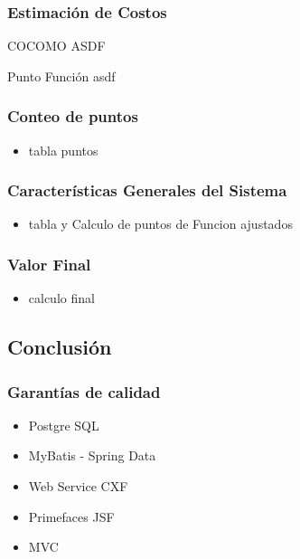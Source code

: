 \documentclass{beamer}
\begin{document}

\begin{frame}
\frametitle{Estimación de Costos}
\begin{block}{COCOMO}
ASDF
\end{block}
\begin{block}{Punto Función}
asdf
\end{block}
\end{frame}


\begin{frame}
\frametitle{Conteo de puntos}
\begin{itemize}
\item tabla puntos
\end{itemize}
\end{frame}


\begin{frame}
\frametitle{Características Generales del Sistema}
\begin{itemize}
\item tabla y Calculo de puntos de Funcion ajustados
\end{itemize}
\end{frame}


\begin{frame}
\frametitle{Valor Final}
\begin{itemize}
\item calculo final
\end{itemize}
\end{frame}


\subsection{Conclusión}


\begin{frame}
\frametitle{Garantías de calidad}
\begin{itemize}
\item Postgre SQL
\item MyBatis - Spring Data
\item Web Service CXF
\item Primefaces JSF
\item MVC
\end{itemize}
\end{frame}
\end{document}
